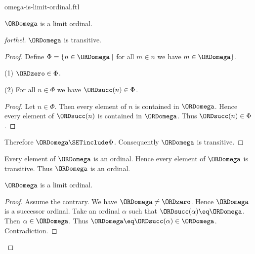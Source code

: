 \documentclass{naproche-library}
\begin{document}
\begin{smodule}[title=$\omega$ is a Limit Ordinal]{omega-is-limit-ordinal.ftl}

\begin{proposition}[forthel,id=SET_THEORY_03_764451995254784]
  $\ORDomega$ is a limit ordinal.
\end{proposition}
\begin{proof}[forthel]
  $\ORDomega$ is transitive.
  \begin{proof}
    Define $\Phi = \{ n \in \ORDomega \mid$ for all $m \in n$ we have $m \in \ORDomega \}$.

    (1) $\ORDzero \in \Phi$.

    (2) For all $n \in \Phi$ we have $\ORDsucc(n) \in \Phi$.
    \begin{proof}
      Let $n \in \Phi$.
      Then every element of $n$ is contained in $\ORDomega$.
      Hence every element of $\ORDsucc(n)$ is contained in $\ORDomega$.
      Thus $\ORDsucc(n) \in \Phi$.
    \end{proof}

    Therefore $\ORDomega \SETinclude \Phi$.
    Consequently $\ORDomega$ is transitive.
  \end{proof}

  Every element of $\ORDomega$ is an ordinal.
  Hence every element of $\ORDomega$ is transitive.
  Thus $\ORDomega$ is an ordinal.

  $\ORDomega$ is a limit ordinal.
  \begin{proof}
    Assume the contrary.
    We have $\ORDomega \neq \ORDzero$.
    Hence $\ORDomega$ is a successor ordinal.
    Take an ordinal $\alpha$ such that $\ORDsucc(\alpha) \eq \ORDomega$.
    Then $\alpha \in \ORDomega$.
    Thus $\ORDomega \eq \ORDsucc(\alpha) \in \ORDomega$.
    Contradiction.
  \end{proof}
\end{proof}
\end{smodule}
\end{document}
